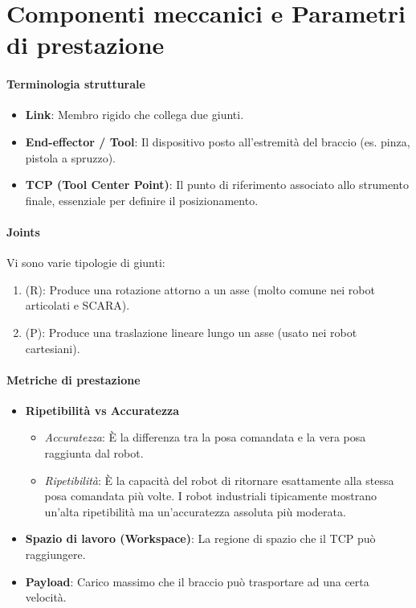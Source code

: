 %
\section{Componenti meccanici e Parametri di prestazione}
\paragraph{Terminologia strutturale}
\begin{itemize}
    \item \textbf{Link}: Membro rigido che collega due giunti.
    \item \textbf{End-effector / Tool}: Il dispositivo posto all'estremità del braccio (es. pinza, pistola a spruzzo).
    \item \textbf{TCP (Tool Center Point)}: Il punto di riferimento associato allo strumento finale, essenziale per definire il posizionamento.
\end{itemize}
%
\paragraph{Joints}
Vi sono varie tipologie di giunti:
\begin{enumerate}
    \item {} (R): Produce una rotazione attorno a un asse (molto comune nei robot articolati e SCARA).
    \item {} (P): Produce una traslazione lineare lungo un asse (usato nei robot cartesiani).
\end{enumerate}
%
\paragraph{Metriche di prestazione}
\begin{itemize}
    \item \textbf{Ripetibilità vs Accuratezza}
          \begin{itemize}
              \item \emph{Accuratezza}: È la differenza tra la posa comandata e la vera posa raggiunta dal robot.
              \item \emph{Ripetibilità}: È la capacità del robot di ritornare esattamente alla stessa posa comandata più volte. I robot industriali tipicamente mostrano un'alta ripetibilità ma un'accuratezza assoluta più moderata.
          \end{itemize}
    \item \textbf{Spazio di lavoro (Workspace)}: La regione di spazio che il TCP può raggiungere.
    \item \textbf{Payload}: Carico massimo che il braccio può trasportare ad una certa velocità.
\end{itemize}

